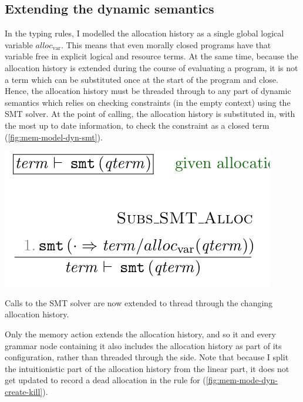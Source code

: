 \subsection{Extending the dynamic semantics}

In the typing rules, I modelled the allocation history as a single global
logical variable $\mathit{alloc}_\mathrm{var}$. This means that even morally
closed programs have that variable free in explicit logical and resource terms.
At the same time, because the allocation history is extended during the course
of evaluating a  program, it is not a term which can be substituted
once at the start of the program and close. Hence, the allocation history must
be threaded through to any part of dynamic semantics which relies on checking
constraints (in the empty context) using the SMT solver. At the point of
calling, the allocation history is substituted in, with the most up to date
information, to check the constraint as a closed term (\cref{fig:mem-model-dyn-smt}).

\begin{marginfigure}
    \includegraphics{figures/mem-model-dyn-smt}
    \caption{Calls to the SMT solver are now extended to thread through the
        changing allocation history.}\label{fig:mem-model-dyn-smt}
\end{marginfigure}

Only the  memory action extends the allocation history, and
so it and every grammar node containing it also includes the allocation history
as part of its configuration, rather than threaded through the
side. Note that
because I split the intuitionistic part of the allocation history from the
linear part, it does not get updated to record a dead allocation in the
rule for  (\cref{fig:mem-mode-dyn-create-kill}).

